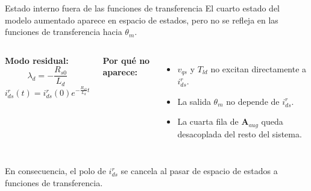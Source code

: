 \documentclass[aspectratio=169,t]{beamer}
\begin{document}
\begin{frame}{Estado interno fuera de las funciones de transferencia}
{\small\color{uncGray}El cuarto estado del modelo aumentado aparece en espacio de estados, pero no se refleja en las funciones de transferencia hacia $\theta_m$.}\par
\vspace{3mm}

\begin{columns}[T,onlytextwidth]
\textbf{Modo residual:}
\begin{equation*}
\lambda_d=-\frac{R_{s0}}{L_d}
\end{equation*}
\begin{equation*}
i_{ds}^{r}(t)=i_{ds}^{r}(0)e^{-\frac{R_{s0}}{L_d}t}
\end{equation*}

\textbf{Por qué no aparece:}
\begin{itemize}
  \item $v_{qs}$ y $T_{ld}$ no excitan directamente a $i_{ds}^{r}$.
  \item La salida $\theta_m$ no depende de $i_{ds}^{r}$.
  \item La cuarta fila de $\bm{A}_{aug}$ queda desacoplada del resto del sistema.
\end{itemize}
\end{columns}

\vspace{2mm}
{\small En consecuencia, el polo de $i_{ds}^{r}$ se cancela al pasar de espacio de estados a funciones de transferencia.}
\end{frame}
\end{document}
